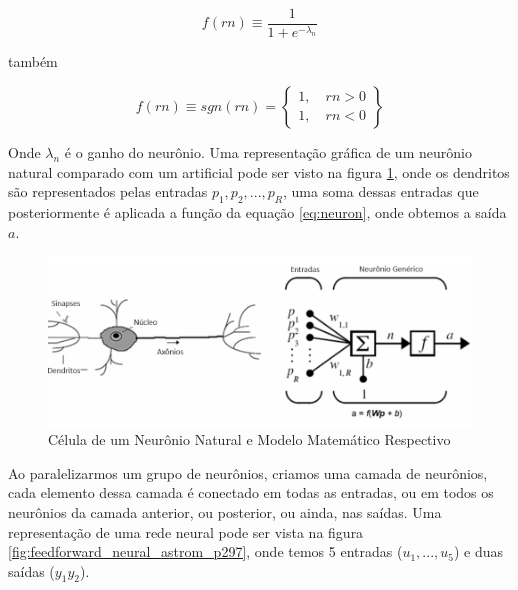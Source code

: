 \begin{equation} \label{eq:neuron}
 f(rn) \equiv \frac{1}{1+e^{-\lambda_n}}
\end{equation}

também

\begin{equation}
 f(rn) \equiv sgn(rn) = \begin{Bmatrix}  1, \quad rn>0 \\ 1, \quad rn<0  \end{Bmatrix}
\end{equation}

Onde $\lambda_n$ é o ganho do neurônio. Uma representação gráfica de um neurônio natural comparado com um artificial pode ser visto na figura \ref{fig:neuronio_unal_p6}, onde os dendritos são representados pelas entradas $p_1, p_2, ..., p_R$, uma soma dessas entradas que posteriormente é aplicada a função da equação \ref{eq:neuron}, onde obtemos a saída $a$.

\begin{figure}[H]
  \caption{Célula de um Neurônio Natural e Modelo Matemático Respectivo}
  \begin{center}
      \includegraphics[scale=0.45]{referencial/img/neuronio_unal_p6}
  \end{center}
  \label{fig:neuronio_unal_p6}
\end{figure}

Ao paralelizarmos um grupo de neurônios, criamos uma camada de neurônios, cada elemento dessa camada é conectado em todas as entradas, ou em todos os neurônios da camada anterior, ou posterior, ou ainda, nas saídas. Uma representação de uma rede neural pode ser vista na figura \ref{fig:feedforward_neural_astrom_p297}, onde temos 5 entradas ($u_1,...,u_5$) e duas saídas ($y_1 y_2$).

